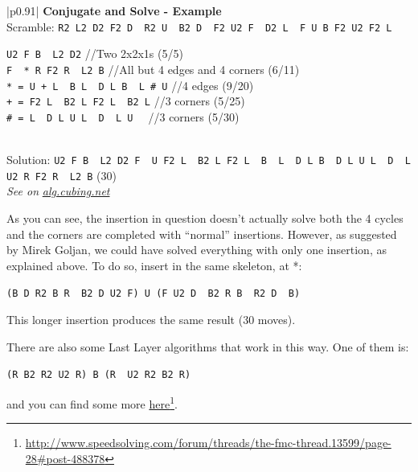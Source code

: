 \documentclass[11pt,a4paper]{book}
\newcommand{\p}{\textquotesingle}
\newcommand{\m}{\texttt}
\newcommand{\ps}{\p\,\,}
\newcommand{\comment}[1]{{\color{gray}\quad//#1}}
\begin{document}
\bigskip
\begin{tabular}{|p{}|}
\hline
\textbf{Conjugate and Solve - Example}\\
\hline
Scramble: \m{R2 L2 D2 F2 D\ps R2 U\ps B2 D\ps F2 U2 F\ps D2 L\ps F U B F2 U2 F2 L}\\
\hline
\begin{minipage}[l]{0.650\textwidth}
\m{U2 F B\ps L2 D2} \comment{Two 2x2x1s (5/5)}\\
\m{F\ps * R F2 R\ps L2 B} \comment{All but 4 edges and 4 corners (6/11)}\\
\m{* = U + L\ps B L\ps D L B\ps L \# U\p} \comment{4 edges (9/20)}\\
\m{+ = F2 L\ps B2 L F2 L\ps B2 L} \comment{3 corners (5/25)}\\
\m{\# = L\ps D L U L\ps D\ps L U\ps} \comment{3 corners (5/30)}
\end{minipage}
\begin{minipage}[c]{0.25\textwidth}

\end{minipage}\\
\hline
Solution: \m{U2 F B\ps L2 D2 F\ps U F2 L\ps B2 L F2 L\ps B\ps L\ps D L B\ps D L U L\ps D\ps L U2 R F2 R\ps L2 B} (30)\\
\hline
\emph{See on }\href{https://alg.cubing.net/?setup=R2_L2_D2_F2_D-_R2_U-_B2_D-_F2_U2_F-_D2_L-_F_U_B_F2_U2_F2_L&alg=U2_F_B-_L2_D2_\%2F\%2FTwo_2x2x1s_(5\%2F5)\%7D\%0AF-_(U_(F2_L-_B2_L_F2_L-_B2_L)_L-_B_L-_D_L_B-_L_(L-_D_L_U_L-_D-_L_U-)_U-)_R_F2_R-_L2_B_\%2F\%2FAll_but_4_edges_and_4_corners_(6\%2F11)}{\emph{alg.cubing.net}}\\
\hline
\end{tabular}
\bigskip

As you can see, the insertion in question doesn't actually solve both the 4 cycles and the corners are completed with ``normal'' insertions. However, as suggested by Mirek Goljan, we could have solved everything with only one insertion, as explained above. To do so, insert in the same skeleton, at *:
\begin{center}
\m{(B D R2 B R\ps B2 D U2 F\p) U (F U2 D\ps B2 R B\ps R2 D\ps B\p)}
\end{center}
This longer insertion produces the same result (30 moves).

There are also some Last Layer algorithms that work in this way. One of them is:
\begin{center}
\m{(R B2 R2 U2 R) B (R\ps U2 R2 B2 R\p)}
\end{center}
and you can find some more \href{https://www.speedsolving.com/forum/threads/the-fmc-thread.13599/page-28\#post-488378}{here}\footnote{\url{http://www.speedsolving.com/forum/threads/the-fmc-thread.13599/page-28\#post-488378}}.
\end{document}
